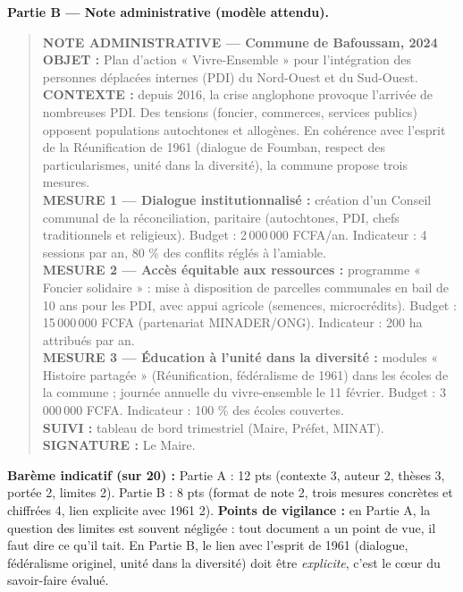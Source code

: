 \documentclass[11pt]{article}
\begin{document}
\begin{corrige}
\textbf{Partie B — Note administrative (modèle attendu).}
\begin{quote}
\textbf{NOTE ADMINISTRATIVE --- Commune de Bafoussam, 2024}\\
\textbf{OBJET :} Plan d'action « Vivre-Ensemble » pour l'intégration des personnes déplacées internes (PDI) du Nord-Ouest et du Sud-Ouest.\\
\textbf{CONTEXTE :} depuis 2016, la crise anglophone provoque l'arrivée de nombreuses PDI. Des tensions (foncier, commerces, services publics) opposent populations autochtones et allogènes. En cohérence avec l'esprit de la Réunification de 1961 (dialogue de Foumban, respect des particularismes, unité dans la diversité), la commune propose trois mesures.\\
\textbf{MESURE 1 --- Dialogue institutionnalisé :} création d'un Conseil communal de la réconciliation, paritaire (autochtones, PDI, chefs traditionnels et religieux). Budget : 2\,000\,000 FCFA/an. Indicateur : 4 sessions par an, 80 \% des conflits réglés à l'amiable.\\
\textbf{MESURE 2 --- Accès équitable aux ressources :} programme « Foncier solidaire » : mise à disposition de parcelles communales en bail de 10 ans pour les PDI, avec appui agricole (semences, microcrédits). Budget : 15\,000\,000 FCFA (partenariat MINADER/ONG). Indicateur : 200 ha attribués par an.\\
\textbf{MESURE 3 --- Éducation à l'unité dans la diversité :} modules « Histoire partagée » (Réunification, fédéralisme de 1961) dans les écoles de la commune ; journée annuelle du vivre-ensemble le 11 février. Budget : 3\,000\,000 FCFA. Indicateur : 100 \% des écoles couvertes.\\
\textbf{SUIVI :} tableau de bord trimestriel (Maire, Préfet, MINAT). \textbf{SIGNATURE :} Le Maire.
\end{quote}
\textbf{Barème indicatif (sur 20) :} Partie A : 12 pts (contexte 3, auteur 2, thèses 3, portée 2, limites 2). Partie B : 8 pts (format de note 2, trois mesures concrètes et chiffrées 4, lien explicite avec 1961 2).
\textbf{Points de vigilance :} en Partie A, la question des limites est souvent négligée : tout document a un point de vue, il faut dire ce qu'il tait. En Partie B, le lien avec l'esprit de 1961 (dialogue, fédéralisme originel, unité dans la diversité) doit être \emph{explicite}, c'est le cœur du savoir-faire évalué.
\end{corrige}

\newpage
\end{document}

